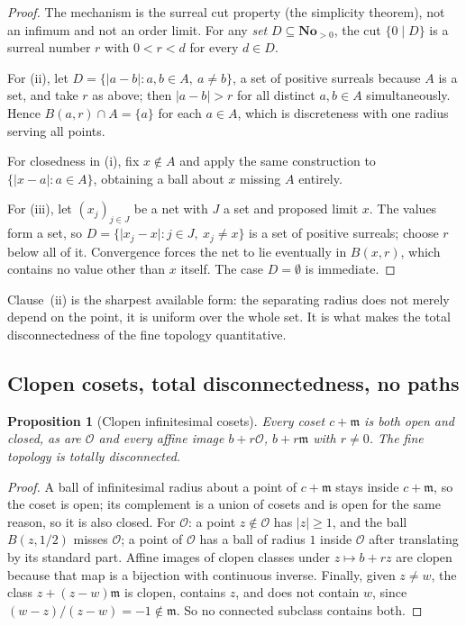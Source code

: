 \documentclass[11pt,a4paper]{article}
\numberwithin{equation}{section}
\newtheorem{proposition}[theorem]{Proposition}
\theoremstyle{definition}
\theoremstyle{remark}
\theoremstyle{plain}
\newcommand{\No}{\mathbf{No}}
\newcommand{\Ov}{\mathcal O}
\newcommand{\mm}{\mathfrak m}
\newcommand{\abs}[1]{\lvert #1\rvert}
\begin{document}
\begin{proof}
The mechanism is the surreal cut property (the simplicity theorem), not
an infimum and not an order limit.  For any \emph{set}
$D\subseteq\No_{>0}$, the cut $\{0\mid D\}$ is a surreal number $r$ with
$0<r<d$ for every $d\in D$.

For (ii), let $D=\{\abs{a-b}:a,b\in A,\ a\ne b\}$, a set of positive
surreals because $A$ is a set, and take $r$ as above; then
$\abs{a-b}>r$ for all distinct $a,b\in A$ simultaneously.  Hence
$B(a,r)\cap A=\{a\}$ for each $a\in A$, which is discreteness with one
radius serving all points.

For closedness in (i), fix $x\notin A$ and apply the same construction
to $\{\abs{x-a}:a\in A\}$, obtaining a ball about $x$ missing $A$
entirely.

For (iii), let $(x_j)_{j\in J}$ be a net with $J$ a set and proposed
limit $x$.  The values form a set, so
$D=\{\abs{x_j-x}:j\in J,\ x_j\ne x\}$ is a set of positive surreals;
choose $r$ below all of it.  Convergence forces the net to lie
eventually in $B(x,r)$, which contains no value other than $x$ itself.
The case $D=\emptyset$ is immediate.
\end{proof}

Clause~(ii) is the sharpest available form: the separating radius does
not merely depend on the point, it is uniform over the whole set.  It is
what makes the total disconnectedness of the fine topology quantitative.

\subsection{Clopen cosets, total disconnectedness, no paths}\label{a:sec:nopath}

\begin{proposition}[Clopen infinitesimal cosets]\label{a:prop:clopen}
Every coset $c+\mm$ is both open and closed, as are $\Ov$ and every
affine image $b+r\Ov$, $b+r\mm$ with $r\ne0$.  The fine topology is
totally disconnected.
\end{proposition}

\begin{proof}
A ball of infinitesimal radius about a point of $c+\mm$ stays inside
$c+\mm$, so the coset is open; its complement is a union of cosets and
is open for the same reason, so it is also closed.  For $\Ov$: a point
$z\notin\Ov$ has $\abs z\ge1$, and the ball $B(z,1/2)$ misses $\Ov$;
a point of $\Ov$ has a ball of radius $1$ inside $\Ov$ after translating
by its standard part.  Affine images of clopen classes under
$z\mapsto b+rz$ are clopen because that map is a bijection with
continuous inverse.  Finally, given $z\ne w$, the class
$z+(z-w)\mm$ is clopen, contains $z$, and does not contain $w$, since
$(w-z)/(z-w)=-1\notin\mm$.  So no connected subclass contains both.
\end{proof}
\end{document}
